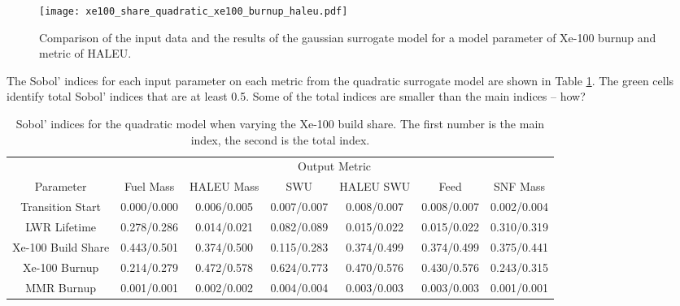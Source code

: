 \begin{figure}
    \centering 
    \texttt{[image: xe100\_share\_quadratic\_xe100\_burnup\_haleu.pdf]}
    \caption{Comparison of the input data and the results of the gaussian 
    surrogate model for a model parameter of Xe-100 burnup and 
    metric of HALEU.}
    \label{fig:s7_quadratic_share_haleu}
\end{figure}

The Sobol' indices for each input parameter on each metric from the quadratic 
surrogate model are shown in Table \ref{tab:s7_sobol_xe100_quadratic}. The 
green cells identify total Sobol' indices that are at least 0.5. Some of the 
total indices are smaller than the main indices -- how?

\begin{table}
    \centering
    \caption{Sobol' indices for the quadratic model when varying the Xe-100 
    build share. The first number is the main index, the second is the total 
    index.}
    \label{tab:s7_sobol_xe100_quadratic}
    \begin{tabular}{c c c c c c c}
        \hline
        & \multicolumn{6}{c}{Output Metric} \\
        Parameter & Fuel Mass & HALEU Mass & SWU & HALEU SWU & Feed & SNF Mass \\
        \hline
        Transition Start & 0.000/0.000& 0.006/0.005 & 0.007/0.007 &
                           0.008/0.007 & 0.008/0.007 & 0.002/0.004\\
        LWR Lifetime & 0.278/0.286 & 0.014/0.021 & 0.082/0.089 & 
                       0.015/0.022 & 0.015/0.022 & 0.310/0.319\\
        Xe-100 Build Share & \cellcolor{green!25}0.443/0.501 & \cellcolor{green!25}0.374/0.500 & 0.115/0.283 & 
                             0.374/0.499 & 0.374/0.499 & 0.375/0.441\\
        Xe-100 Burnup & 0.214/0.279 & \cellcolor{green!25}0.472/0.578 & \cellcolor{green!25}0.624/0.773 &
                        \cellcolor{green!25}0.470/0.576 & \cellcolor{green!25}0.430/0.576 & 0.243/0.315\\
        MMR Burnup & 0.001/0.001 & 0.002/0.002 & 0.004/0.004 &
                     0.003/0.003 & 0.003/0.003 & 0.001/0.001\\
        \hline        
    \end{tabular}
\end{table}

